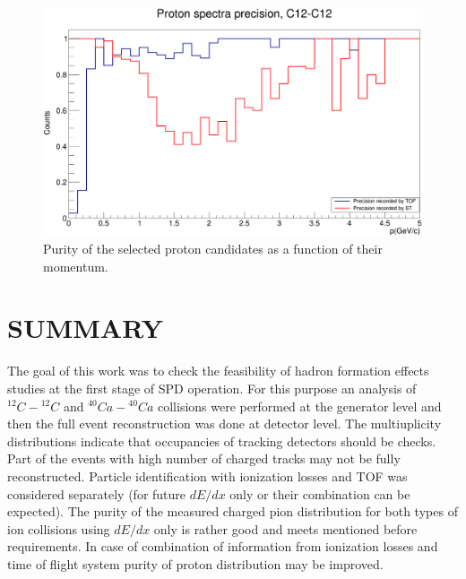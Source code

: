 \documentclass[12pt]{article}
\begin{document}
\begin{figure}[h]
\vspace{0.15cm}
	\centering
	\includegraphics[width=.6\textwidth]{ProtonSpectraPrecision_C12.png}
	\caption{Purity of the selected proton candidates as a function of their momentum.}
	\label{protons-p-purity}
\end{figure}

\section{SUMMARY}
The goal of this work was to check the feasibility of hadron
formation effects studies at the first stage of SPD operation. For this purpose
an analysis of $^{12}C-{^{12}C}$ and $^{40}Ca-{^{40}Ca}$
collisions were performed at the generator level and then the full event reconstruction was done at detector level. The multiuplicity distributions
indicate that occupancies of tracking detectors should be checks.
Part of the events with high number of charged tracks may not be
fully reconstructed. Particle identification with
ionization losses and TOF was considered separately (for
future $dE/dx$ only or their combination can be expected).
The purity of the measured charged pion distribution for both types of ion collisions using $dE/dx$ only is rather good and meets mentioned before requirements. In case of combination of information from ionization losses and time of flight system purity of proton distribution may be improved.

\end{document}
